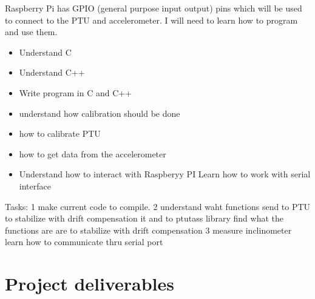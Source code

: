 \documentclass[11pt,fleqn,twoside]{article}
\begin{document}
Raspberry Pi has GPIO (general purpose input output) pins which will be used to connect to the PTU and accelerometer. I will need to learn how to program and use them.    

\begin{itemize} \itemsep1pt \parskip0pt 
\item Understand C
\item Understand C++
\item Write program in C and C++
\item understand how calibration should be done
\item how to calibrate PTU
\item how to get data from the accelerometer
\item Understand how to interact with Raspberyy  PI
Learn how to work with serial interface
\end{itemize}
 Tasks: 1 make current code to compile.
       2 understand waht functions send to PTU to stabilize with drift compensation it and to ptutass library find what the functions are are to stabilize with drift compensation
       3 measure inclinometer
       learn how to communicate thru serial port
       
 
\section{Project deliverables}
\end{document}
